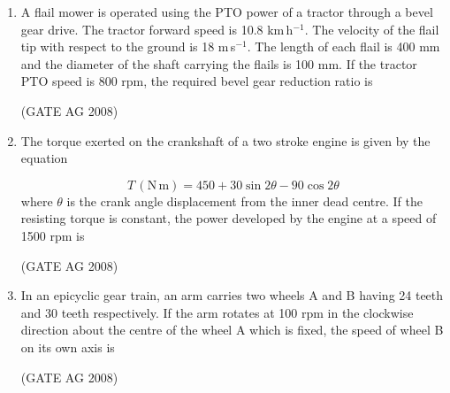 \documentclass[journal]{IEEEtran}
\begin{document}
\begin{enumerate}
\medskip

\item 
 A flail mower is operated using the PTO power of a tractor through a bevel gear drive. The tractor forward speed is 10.8 km\,h$^{-1}$. The velocity of the flail tip with respect to the ground is 18 m\,s$^{-1}$. The length of each flail is 400 mm and the diameter of the shaft carrying the flails is 100 mm. If the tractor PTO speed is 800 rpm, the required bevel gear reduction ratio is
\begin{enumerate}
\end{enumerate}
\hfill(GATE AG 2008)\\

\medskip

\item 
 The torque exerted on the crankshaft of a two stroke engine is given by the equation

\[T \, (\mathrm{N\,m}) = 450 + 30 \sin 2\theta - 90 \cos 2\theta\]
where $\theta$ is the crank angle displacement from the inner dead centre. If the resisting torque is constant, the power developed by the engine at a speed of 1500 rpm is
\begin{enumerate}
\end{enumerate}
\hfill(GATE AG 2008)\\

\medskip

\item 
 In an epicyclic gear train, an arm carries two wheels A and B having 24 teeth and 30 teeth respectively. If the arm rotates at 100 rpm in the clockwise direction about the centre of the wheel A which is fixed, the speed of wheel B on its own axis is
\begin{enumerate}
\end{enumerate}
\hfill(GATE AG 2008)\\


\end{enumerate}
\end{document}

